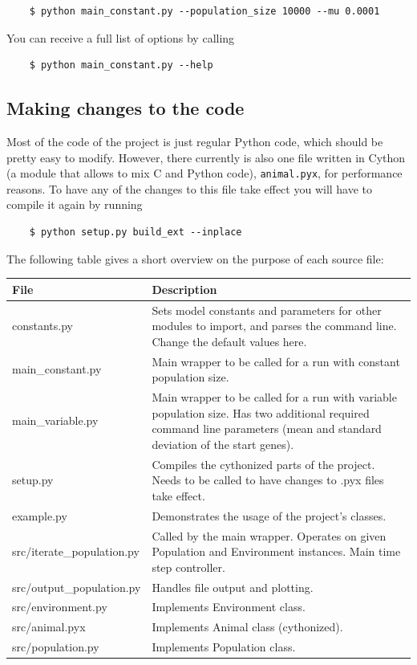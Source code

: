 \documentclass[
12pt, %
a4paper, %
headinclude,footinclude %
]{article}
\begin{document}
\begin{verbatim}
    $ python main_constant.py --population_size 10000 --mu 0.0001
\end{verbatim}

\noindent You can receive a full list of options by calling

\begin{verbatim}
    $ python main_constant.py --help
\end{verbatim}

\subsection{Making changes to the code}

Most of the code of the project is just regular Python code, which should be pretty easy to modify. However, there currently is also one file written in Cython (a module that allows to mix C and Python code), \verb|animal.pyx|, for performance reasons. To have any of the changes to this file take effect you will have to compile it again by running

\begin{verbatim}
    $ python setup.py build_ext --inplace
\end{verbatim}

\noindent The following table gives a short overview on the purpose of each source file:

\vspace{20pt}
\begin{tabularx}{\textwidth}{l | X}
	File & Description \\ \midrule
	constants.py & Sets model constants and parameters for other modules to import, and parses the command line. Change the default values here. \\
	main\_constant.py & Main wrapper to be called for a run with constant population size. \\
	main\_variable.py & Main wrapper to be called for a run with variable population size. Has two additional required command line parameters (mean and standard deviation of the start genes).\\
	setup.py & Compiles the cythonized parts of the project. Needs to be called to have changes to .pyx files take effect.\\
	example.py & Demonstrates the usage of the project's classes. \\
	src/iterate\_population.py & Called by the main wrapper. Operates on given Population and Environment instances. Main time step controller. \\
	src/output\_population.py & Handles file output and plotting. \\
	src/environment.py & Implements Environment class. \\
	src/animal.pyx & Implements Animal class (cythonized). \\
	src/population.py & Implements Population class.
\end{tabularx}
\end{document}
